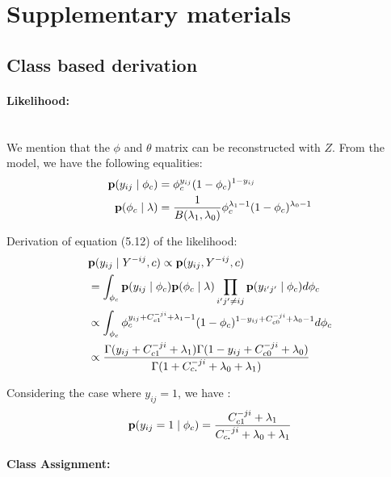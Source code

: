 \documentclass[a4paper, 12pt]{article}
\begin{document}
\section{Supplementary materials}

\subsection{Class based derivation}

\paragraph{Likelihood:}~\\

We mention that  the $\phi$ and $\theta$ matrix can be reconstructed with $Z$. From the model, we have the following equalities:
\begin{align}
\mathbf{p}(y_{ij} \mid \phi_c) &= \phi_c^{y_{ij}}(1-\phi_c)^{1-y_{ij}} \\
\mathbf{p}(\phi_c \mid \lambda) &= \frac{1}{B(\lambda_1, \lambda_0)} \phi_c^{\lambda_1-1}(1-\phi_c)^{\lambda_0 -1}
\end{align}


Derivation of equation (5.12) of the likelihood:
\begin{align}
&\mathbf{p}(y_{ij} \mid Y^{-ij}, c) \propto \mathbf{p}(y_{ij}, Y^{-ij}, c) \\
&= \int_{\phi_c} \mathbf{p}(y_{ij} \mid \phi_c) \mathbf{p}(\phi_c \mid \lambda) \prod_{i'j' \neq ij}\mathbf{p}(y_{i'j'} \mid \phi_c) d\phi_c \\
&\propto \int_{\phi_c} \phi_c^{y_{ij} + C_{c1}^{-ji} + \lambda_1-1}(1-\phi_c)^{ 1-y_{ij} + C_{c0}^{-ji} + \lambda_0 -1} d\phi_c \\
&\propto \frac{\Gamma(y_{ij} + C_{c1}^{-ji} + \lambda_1) \Gamma( 1-y_{ij} + C_{c0}^{-ji} + \lambda_0) }{\Gamma(  1+ C_{c\bm{.}}^{-ji} + \lambda_0 + \lambda_1)}
\end{align}

Considering the case where $y_{ij} =1$, we have :
\begin{equation}
\mathbf{p}(y_{ij}=1 \mid \phi_c) = \frac{C_{c1}^{-ji} + \lambda_1}{C_{c\bm{.}}^{-ji} + \lambda_0 + \lambda_1}
\end{equation}


\paragraph{Class Assignment:}~\\
\end{document}

